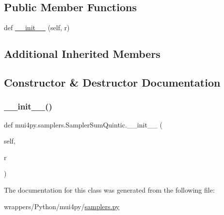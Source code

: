 \subsection*{Public Member Functions}
\begin{DoxyCompactItemize}
\item 
def \hyperlink{classmui4py_1_1samplers_1_1_sampler_sum_quintic_a5d58df36105d4741b91df031ba56a4cc}{\+\_\+\+\_\+init\+\_\+\+\_\+} (self, r)
\end{DoxyCompactItemize}
\subsection*{Additional Inherited Members}


\subsection{Constructor \& Destructor Documentation}
\mbox{\label{classmui4py_1_1samplers_1_1_sampler_sum_quintic_a5d58df36105d4741b91df031ba56a4cc}} 
\subsubsection{\texorpdfstring{\+\_\+\+\_\+init\+\_\+\+\_\+()}{\_\_init\_\_()}}
{\footnotesize\ttfamily def mui4py.\+samplers.\+Sampler\+Sum\+Quintic.\+\_\+\+\_\+init\+\_\+\+\_\+ (\begin{DoxyParamCaption}\item[{}]{self,  }\item[{}]{r }\end{DoxyParamCaption})}



The documentation for this class was generated from the following file\+:\begin{DoxyCompactItemize}
\item 
wrappers/\+Python/mui4py/\hyperlink{samplers_8py}{samplers.\+py}\end{DoxyCompactItemize}
